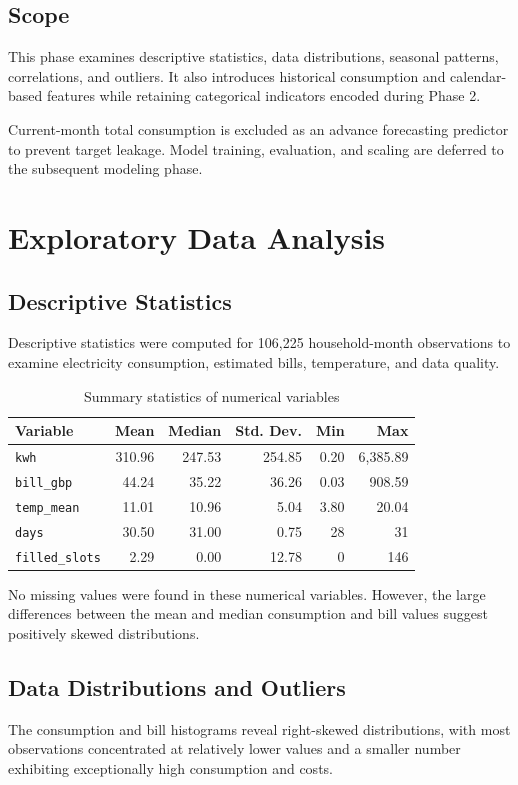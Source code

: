 \documentclass[11pt,a4paper]{article}
\begin{document}
\subsection{Scope}
This phase examines descriptive statistics, data distributions, seasonal patterns, correlations, and outliers. It also introduces historical consumption and calendar-based features while retaining categorical indicators encoded during Phase 2.

Current-month total consumption is excluded as an advance forecasting predictor to prevent target leakage. Model training, evaluation, and scaling are deferred to the subsequent modeling phase.

\section{Exploratory Data Analysis}
\subsection{Descriptive Statistics}
Descriptive statistics were computed for 106,225 household-month observations to examine electricity consumption, estimated bills, temperature, and data quality.
\begin{table}[H]\centering\caption{Summary statistics of numerical variables}\small
\begin{tabular}{@{}lrrrrr@{}}\toprule
Variable & Mean & Median & Std. Dev. & Min & Max\\\midrule
\texttt{kwh} & 310.96 & 247.53 & 254.85 & 0.20 & 6,385.89\\
\texttt{bill\_gbp} & 44.24 & 35.22 & 36.26 & 0.03 & 908.59\\
\texttt{temp\_mean} & 11.01 & 10.96 & 5.04 & 3.80 & 20.04\\
\texttt{days} & 30.50 & 31.00 & 0.75 & 28 & 31\\
\texttt{filled\_slots} & 2.29 & 0.00 & 12.78 & 0 & 146\\\bottomrule
\end{tabular}\end{table}
No missing values were found in these numerical variables. However, the large differences between the mean and median consumption and bill values suggest positively skewed distributions.
\subsection{Data Distributions and Outliers}
The consumption and bill histograms reveal right-skewed distributions, with most observations concentrated at relatively lower values and a smaller number exhibiting exceptionally high consumption and costs.
\end{document}
